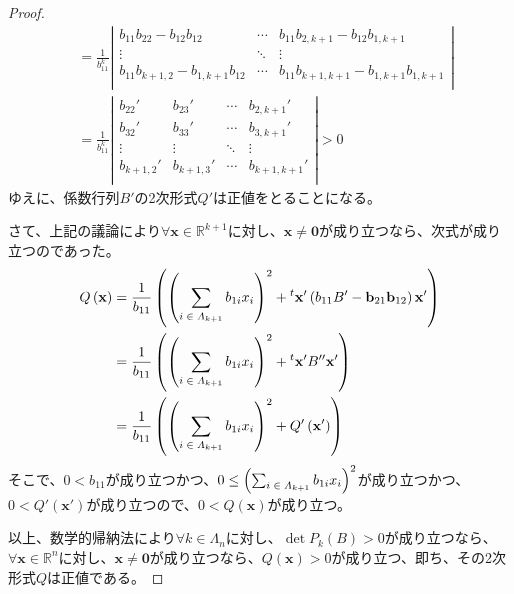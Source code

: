 \documentclass[dvipdfmx]{jsarticle}
\begin{document}
\begin{proof}
\begin{align*}
&= \frac{1}{b_{11}^{k}}\left| \begin{matrix}
b_{11}b_{22} - b_{12}b_{12} & \cdots & b_{11}b_{2,k + 1} - b_{12}b_{1,k + 1} \\
 \vdots & \ddots & \vdots \\
b_{11}b_{k + 1,2} - b_{1,k + 1}b_{12} & \cdots & b_{11}b_{k + 1,k + 1} - b_{1,k + 1}b_{1,k + 1} \\
\end{matrix} \right|\\
&= \frac{1}{b_{11}^{k}}\left| \begin{matrix}
b_{22}' & b_{23}' & \cdots & b_{2,k + 1}' \\
b_{32}' & b_{33}' & \cdots & b_{3,k + 1}' \\
 \vdots & \vdots & \ddots & \vdots \\
b_{k + 1,2}' & b_{k + 1,3}' & \cdots & b_{k + 1,k + 1}' \\
\end{matrix} \right| > 0
\end{align*}
ゆえに、係数行列$B'$の2次形式$Q'$は正値をとることになる。\par
さて、上記の議論により$\forall\mathbf{x} \in \mathbb{R}^{k + 1}$に対し、$\mathbf{x} \neq \mathbf{0}$が成り立つなら、次式が成り立つのであった。
\begin{align*}
Q\left( \mathbf{x} \right) &= \frac{1}{b_{11}}\left( \left( \sum_{\scriptsize \begin{matrix}
i \in \varLambda_{k + 1} \\
\end{matrix}} {b_{1i}x_{i}} \right)^{2} +{}^t \mathbf{x}'\left( b_{11}B' - \mathbf{b}_{21}\mathbf{b}_{12} \right)\mathbf{x}' \right)\\
&= \frac{1}{b_{11}}\left( \left( \sum_{\scriptsize \begin{matrix}
i \in \varLambda_{k + 1} \\
\end{matrix}} {b_{1i}x_{i}} \right)^{2} +{}^t \mathbf{x}'B''\mathbf{x}' \right)\\
&= \frac{1}{b_{11}}\left( \left( \sum_{\scriptsize \begin{matrix}
i \in \varLambda_{k + 1} \\
\end{matrix}} {b_{1i}x_{i}} \right)^{2} + Q'\left( \mathbf{x}' \right) \right)
\end{align*}
そこで、$0 < b_{11}$が成り立つかつ、$0 \leq \left( \sum_{\scriptsize \begin{matrix}
i \in \varLambda_{k + 1} \\
\end{matrix}} {b_{1i}x_{i}} \right)^{2}$が成り立つかつ、$0 < Q'\left( \mathbf{x}' \right)$が成り立つので、$0 < Q\left( \mathbf{x} \right)$が成り立つ。\par
以上、数学的帰納法により$\forall k \in \varLambda_{n}$に対し、$\det{P_{k}(B)} > 0$が成り立つなら、$\forall\mathbf{x} \in \mathbb{R}^{n}$に対し、$\mathbf{x} \neq \mathbf{0}$が成り立つなら、$Q\left( \mathbf{x} \right) > 0$が成り立つ、即ち、その2次形式$Q$は正値である。
\end{proof}
\end{document}
